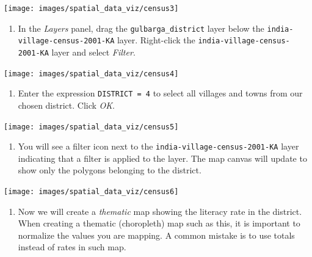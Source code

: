 \documentclass[
  12pt,
  a4paper]{article}
\providecommand{\tightlist}{%
  \setlength{\itemsep}{0pt}\setlength{\parskip}{0pt}}
\begin{document}
\begin{center}\texttt{[image: images/spatial\_data\_viz/census3]} \end{center}

\begin{enumerate}
\def\labelenumi{\arabic{enumi}.}
\setcounter{enumi}{3}
\tightlist
\item
  In the \emph{Layers} panel, drag the \texttt{gulbarga\_district} layer
  below the \texttt{india-village-census-2001-KA} layer. Right-click the
  \texttt{india-village-census-2001-KA} layer and select \emph{Filter}.
\end{enumerate}

\begin{center}\texttt{[image: images/spatial\_data\_viz/census4]} \end{center}

\begin{enumerate}
\def\labelenumi{\arabic{enumi}.}
\setcounter{enumi}{4}
\tightlist
\item
  Enter the expression \texttt{DISTRICT\ =\ 4} to select all villages
  and towns from our chosen district. Click \emph{OK}.
\end{enumerate}

\begin{center}\texttt{[image: images/spatial\_data\_viz/census5]} \end{center}

\begin{enumerate}
\def\labelenumi{\arabic{enumi}.}
\setcounter{enumi}{5}
\tightlist
\item
  You will see a filter icon next to the
  \texttt{india-village-census-2001-KA} layer indicating that a filter
  is applied to the layer. The map canvas will update to show only the
  polygons belonging to the district.
\end{enumerate}

\begin{center}\texttt{[image: images/spatial\_data\_viz/census6]} \end{center}

\begin{enumerate}
\def\labelenumi{\arabic{enumi}.}
\setcounter{enumi}{6}
\tightlist
\item
  Now we will create a \emph{thematic} map showing the literacy rate in
  the district. When creating a thematic (choropleth) map such as this,
  it is important to normalize the values you are mapping. A common
  mistake is to use totals instead of rates in such map.
\end{enumerate}
\end{document}
